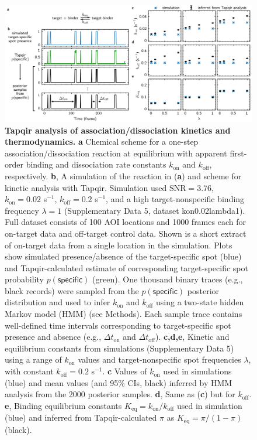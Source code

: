 \begin{figure}[h]
\centering
\includegraphics[width=\textwidth]{figures/figure6.png}
\caption{\textbf{Tapqir analysis of association/dissociation kinetics and thermodynamics.} \textbf{a} Chemical scheme for a one-step association/dissociation reaction at equilibrium with apparent first-order binding and dissociation rate constants $k_{\mathrm{on}}$ and $k_{\mathrm{off}}$, respectively. \textbf{b}, A simulation of the reaction in (\textbf{a}) and scheme for kinetic analysis with Tapqir. Simulation used $\mathrm{SNR} = 3.76$, $k_\mathrm{on} = 0.02$ s$^{-1}$, $k_\mathrm{off} = 0.2$ s$^{-1}$, and a high target-nonspecific binding frequency $\lambda = 1$ (Supplementary Data 5, dataset kon0.02lambda1). Full dataset consists of 100 AOI locations and 1000 frames each for on-target data and off-target control data. Shown is a short extract of on-target data from a single location in the simulation.  Plots show simulated presence/absence of the target-specific spot (blue) and Tapqir-calculated estimate of corresponding target-specific spot probability $p(\mathsf{specific})$ (green). One thousand binary traces (e.g., black records) were sampled from the $p(\mathsf{specific})$ posterior distribution and used to infer $k_\mathrm{on}$ and $k_\mathrm{off}$ using a two-state hidden Markov model (HMM) (see Methods). Each sample trace contains well-defined time intervals corresponding to target-specific spot presence and absence (e.g., $\Delta t_\mathrm{on}$ and $\Delta t_\mathrm{off}$). \textbf{c,d,e}, Kinetic and equilibrium constants from simulations (Supplementary Data 5) using a range of $k_\mathrm{on}$ values and  target-nonspecific spot frequencies $\lambda$, with constant $k_\mathrm{off} = 0.2$ s$^{-1}$. \textbf{c} Values of $k_{\mathrm{on}}$ used in simulations (blue) and mean values (and 95\% CIs, black) inferred by HMM analysis from the 2000 posterior samples. \textbf{d}, Same as (\textbf{c}) but for $k_{\mathrm{off}}$. \textbf{e},  Binding equilibrium constants $K_{\mathrm{eq}} = k_{\mathrm{on}} / k_{\mathrm{off}}$ used in simulation (blue) and inferred from Tapqir-calculated $\pi$ as $K_{\mathrm{eq}} = \pi / (1 - \pi)$ (black). }
\label{fig:kinetic_analysis}
\end{figure}
\clearpage
\pagebreak

